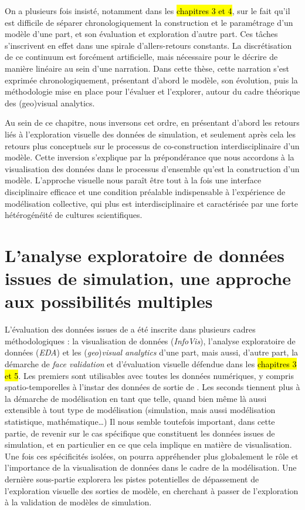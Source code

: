 On a plusieurs fois insisté, notamment dans les \hl{chapitres 3 et 4}, sur le fait qu'il est difficile de séparer chronologiquement la construction et le paramétrage d'un modèle d'une part, et son évaluation et exploration d'autre part.
Ces tâches s'inscrivent en effet dans une spirale d'allers-retours constants.
La discrétisation de ce continuum est forcément artificielle, mais nécessaire pour le décrire de manière linéaire au sein d'une narration.
Dans cette thèse, cette narration s'est exprimée chronologiquement, présentant d'abord le modèle, son évolution, puis la méthodologie mise en place pour l'évaluer et l'explorer, autour du cadre théorique des (geo)visual analytics.

Au sein de ce chapitre, nous inversons cet ordre, en présentant d'abord les retours liés à l'exploration visuelle des données de simulation, et seulement après cela les retours plus conceptuels sur le processus de co-construction interdisciplinaire d'un modèle.
Cette inversion s'explique par la prépondérance que nous accordons à la visualisation des données dans le processus d'ensemble qu'est la construction d'un modèle.
L'approche visuelle nous paraît être tout à la fois une interface disciplinaire efficace et une condition préalable indispensable à l'expérience de modélisation collective, qui plus est interdisciplinaire et caractérisée par une forte hétérogénéité de cultures scientifiques.

\clearpage
\let\orisectionmark\sectionmark
\renewcommand\sectionmark[1]{}%
\section{L'analyse exploratoire de données issues de simulation, une approche aux possibilités multiples}
\orisectionmark{Retour sur l'analyse de données de simulation}
\let\sectionmark\orisectionmark

L'évaluation des données issues de \simfeodal{} a été inscrite dans plusieurs cadres méthodologiques :
la visualisation de données (\textit{InfoVis}), l'analyse exploratoire de données (\textit{EDA}) et les (\textit{geo})\textit{visual} \textit{analytics} d'une part, mais aussi, d'autre part, la démarche de \textit{face validation} et d'évaluation visuelle défendue dans les \hl{chapitres 3 et 5}.
Les premiers sont utilisables avec toutes les données numériques, y compris spatio-temporelles à l'instar des données de sortie de \simfeodal{}.
Les seconds tiennent plus à la démarche de modélisation en tant que telle, quand bien même là aussi extensible à tout type de modélisation (simulation, mais aussi modélisation statistique, mathématique\ldots)
Il nous semble toutefois important, dans cette partie, de revenir sur le cas spécifique que constituent les données issues de simulation, et en particulier en ce que cela implique en matière de visualisation.
Une fois ces spécificités isolées, on pourra appréhender plus globalement le rôle et l'importance de la visualisation de données dans le cadre de la modélisation.
Une dernière sous-partie explorera les pistes potentielles de dépassement de l'exploration visuelle des sorties de modèle, en cherchant à passer de l'exploration à la validation de modèles de simulation.

